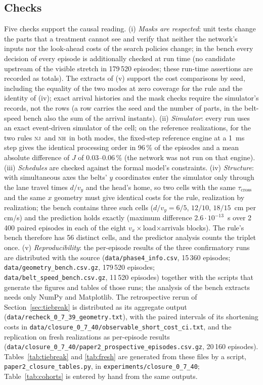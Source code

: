 \documentclass[11pt,a4paper]{article}
\newcommand{\nj}{\textsc{nj}}
\newcommand{\nh}{\textsc{nh}}
\newcommand{\tcross}{\tau_{\mathrm{cross}}}
\begin{document}
\subsection{Checks}
Five checks support the causal reading. (i) \emph{Masks are respected}: unit tests change
the parts that a treatment cannot see and verify that neither the network's inputs nor the
look-ahead costs of the search policies change; in the bench every decision of every
episode is additionally checked at run time (no candidate upstream of the visible stretch
in 179\,520 episodes; these run-time assertions are recorded as totals). The extracts of
(v) support the cost comparisons by seed, including the equality of the two modes at
zero coverage for the rule and the identity of (iv); exact arrival histories and the mask
checks require the simulator's records, not the rows (a row carries the seed and the
number of parts, in the belt-speed bench also the sum of the arrival instants).
(ii) \emph{Simulator}: every run uses an exact event-driven
simulator of the cell; on the reference realizations, for the two rules \nj\ and \nh\ in
both modes, the fixed-step reference engine at a
1~ms step gives the identical processing order in 96\,\% of the episodes and a mean
absolute difference of $J$ of 0.03--0.06\,\% (the network was not run on that engine). (iii) \emph{Schedules} are checked against
the formal model's constraints. (iv) \emph{Structure}: with simultaneous axes the belts'
$y$ coordinates enter the simulator only through the lane travel times $d/v_y$ and the
head's home, so two cells with the same $\tcross$ and the same $x$ geometry must give
identical costs for the rule, realization by realization; the bench contains three such
cells ($d/v_y=6/5$, $12/10$, $18/15$~cm per cm/s) and the prediction holds exactly
(maximum difference $2.6\cdot10^{-13}$~s over 2\,400 paired episodes in each of the eight
$v_x\times$load$\times$arrivals blocks). The rule's bench therefore has 56 distinct cells,
and the predictor analysis counts the triplet once. (v) \emph{Reproducibility}: the
per-episode results of the three confirmatory runs are distributed with the source
(\texttt{data/phase4\_info.csv}, 15\,360 episodes; \texttt{data/geometry\_bench.csv.gz},
179\,520 episodes; \texttt{data/belt\_speed\_bench.csv.gz}, 11\,520 episodes) together with
the scripts that generate the figures and tables of those runs; the analysis of the
bench extracts needs only NumPy and Matplotlib. The retrospective rerun of
Section~\ref{sec:tiebreak} is distributed as its aggregate output
(\texttt{data/recheck\_0\_7\_39\_geometry.txt}), with the paired intervals of its
shortening costs in \texttt{data/closure\_0\_7\_40/observable\_short\_cost\_ci.txt}, and the
replication on fresh realizations as per-episode results
(\texttt{data/closure\_0\_7\_40/paper2\_prospective\_episodes.csv.gz}, 20\,160 episodes).
Tables~\ref{tab:tiebreak} and \ref{tab:fresh} are generated from these files by a
script, \texttt{paper2\_\allowbreak closure\_\allowbreak tables.py}, in
\texttt{experiments/closure\_0\_7\_40}; Table~\ref{tab:cohorts}
is entered by hand from the same outputs.
\end{document}
